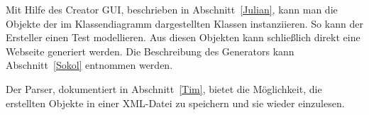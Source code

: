 Mit Hilfe des Creator GUI, beschrieben in Abschnitt~\ref{Julian}, kann man die Objekte der im Klassendiagramm dargestellten Klassen instanziieren. 
So kann der Ersteller einen Test modellieren.
Aus diesen Objekten kann schließlich direkt eine Webseite generiert werden. 
Die Beschreibung des Generators kann Abschnitt~\ref{Sokol} entnommen werden.

Der Parser, dokumentiert in Abschnitt~\ref{Tim}, bietet die Möglichkeit, die erstellten Objekte in einer XML-Datei zu speichern und sie wieder einzulesen.



